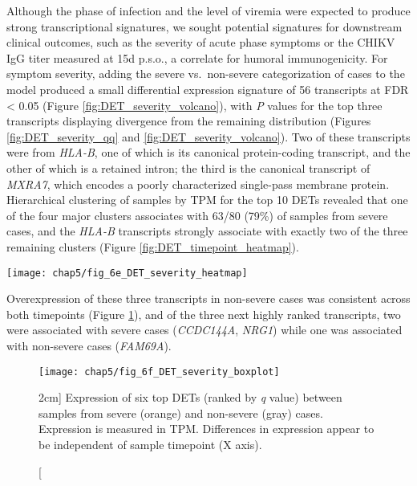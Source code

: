 Although the phase of infection and the level of viremia were expected to produce strong transcriptional signatures, we sought potential signatures for downstream clinical outcomes, such as the severity of acute phase symptoms or the CHIKV IgG titer measured at 15d p.s.o., a correlate for humoral immunogenicity. For symptom severity, adding the severe vs.\ non-severe categorization of cases to the model produced a small differential expression signature of 56 transcripts at FDR < 0.05 (Figure \ref{fig:DET_severity_volcano}), with \emph{P} values for the top three transcripts displaying divergence from the remaining distribution (Figures \ref{fig:DET_severity_qq} and \ref{fig:DET_severity_volcano}). Two of these transcripts were from \emph{HLA-B}, one of which is its canonical protein-coding transcript, and the other of which is a retained intron; the third is the canonical transcript of \emph{MXRA7}, which encodes a poorly characterized single-pass membrane protein. Hierarchical clustering of samples by TPM for the top 10 DETs revealed that one of the four major clusters associates with 63/80 (79\%) of samples from severe cases, and the \emph{HLA-B} transcripts strongly associate with exactly two of the three remaining clusters (Figure \ref{fig:DET_timepoint_heatmap}).
\begin{figure*}[htb]
  \centering
  \texttt{[image: chap5/fig\_6e\_DET\_severity\_heatmap]}
  \caption[Top 10 differentially expressed host transcripts for CHIKV symptom severity]{
  Heatmap of DET expression as in Figure \ref{fig:DET_timepoint_heatmap} but for the top 10 DETs between samples from severe and non-severe cases. Four major clusters of samples are highlighted.
  }
  \label{fig:DET_severity_heatmap}
\end{figure*}
Overexpression of these three transcripts in non-severe cases was consistent across both timepoints (Figure \ref{fig:DET_severity_boxplot}), and of the three next highly ranked transcripts, two were associated with severe cases (\emph{CCDC144A}, \emph{NRG1}) while one was associated with non-severe cases (\emph{FAM69A}).

\begin{figure}[htb]
  \centering
  \texttt{[image: chap5/fig\_6f\_DET\_severity\_boxplot]}
  \caption[Differential expression of severity DETs holds across both timepoints][2cm]{
  Expression of six top DETs (ranked by \emph{q} value) between samples from severe (orange) and non-severe (gray) cases. Expression is measured in TPM. Differences in expression appear to be independent of sample timepoint (X axis). 
  }
  \label{fig:DET_severity_boxplot}
\end{figure}

